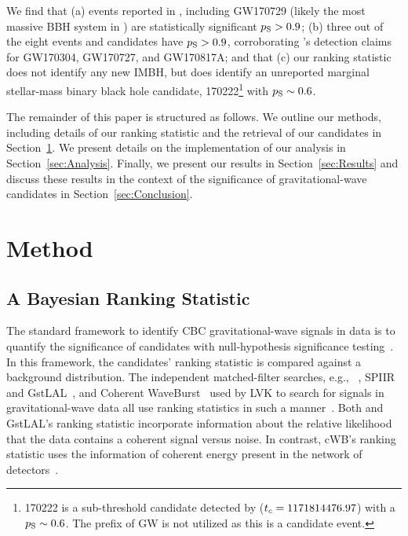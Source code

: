 \documentclass[useAMS,fleqn, usenatbib, final]{mnras}
\newcommand{\gstlal}{{\sc GstLAL}\xspace}
\newcommand{\cwb}{{\sc cWB}\xspace}
\newcommand{\spiir}{{\sc SPIIR}\xspace}
\newcommand{\pycbc}{{\sc {{PyCBC}}}\xspace}
\newcommand{\GWTC}{{\sc {{GWTC-1}}}\xspace}
\newcommand{\IAS}{{\sc {{IAS}}}\xspace}
\newcommand{\fancytext}[1]{{\relax\ifmmode#1\else $#1$\fi}\xspace}
\newcommand{\pastrobcr}{\fancytext{p_\text{S}}}
\newcommand{\tc}{\fancytext{t_c}}
\begin{document}
We find that (a) events reported in \GWTC, including GW170729 (likely the most massive BBH system in \GWTC) are statistically significant ${\pastrobcr>0.9}$; (b) three out of the eight \IAS events and candidates have ${\pastrobcr>0.9}$, corroborating \IAS's detection claims for GW170304, GW170727, and GW170817A; and that (c) our ranking statistic does not identify any new IMBH, but does identify an unreported marginal stellar-mass binary black hole candidate, 170222\footnote{170222 is a sub-threshold candidate detected by \pycbc (${\tc = 1171814476.97}$) with a ${\pastrobcr\sim0.6}$. The prefix of GW is not utilized as this is a candidate event.} with ${\pastrobcr\sim0.6}$. 

The remainder of this paper is structured as follows. We outline our methods, including details of our ranking statistic and the retrieval of our candidates in Section~\ref{sec:method}. We present details on the implementation of our analysis in Section~\ref{sec:Analysis}. Finally, we present our results in Section~\ref{sec:Results} and discuss these results in the context of the significance of gravitational-wave candidates in Section~\ref{sec:Conclusion}.

\section{Method}
\label{sec:method}
\subsection{A Bayesian Ranking Statistic}
The standard framework to identify CBC gravitational-wave signals in data is to quantify the significance of candidates with null-hypothesis significance testing~\citep{GWTC1, GWTC2}. In this framework, the candidates' ranking statistic is compared against a background distribution. The independent matched-filter searches, e.g., \pycbc~\citep{pycbc_og4}, \spiir~\citep{spiir} and \gstlal~\citep{sachdev2019gstlal}, and Coherent WaveBurst~\citep{cwb} used by LVK to search for signals in gravitational-wave data all use ranking statistics in such a manner~\citep{GWTC1}. Both \pycbc and \gstlal's ranking statistic incorporate information about the relative likelihood that the data contains a coherent signal versus noise. In contrast, \cwb's ranking statistic uses the information of coherent energy present in the network of detectors~\citep{GWTC1}. 
\end{document}
